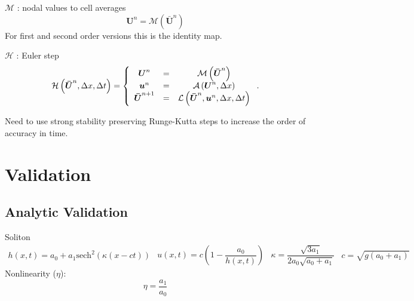 \documentclass[pdf]{beamer}
\begin{document}
\begin{frame}{$\mathcal{M}$ : nodal values to cell averages}
\[
	\boldsymbol{U}^n = \mathcal{M}\left(\boldsymbol{\bar{U}}^n\right) \]
For first and second order versions this is the identity map.
\end{frame}


\begin{frame}{$\mathcal{H}$ : Euler step}
\[\mathcal{H}\left(\boldsymbol{\bar{U}}^n,\Delta x ,\Delta t \right) = \left\lbrace 
\begin{array}{c c c} 
	\boldsymbol{U}^n &=& \mathcal{M}\left(\boldsymbol{\bar{U}}^n\right) \\
	\boldsymbol{u}^n &=& \mathcal{A}\left(\boldsymbol{U}^n, \Delta x\right) \\
	\boldsymbol{\bar{U}}^{n+1} &=& \mathcal{L}\left(\boldsymbol{\bar{U}}^{n},\boldsymbol{u}^n, \Delta x ,\Delta t\right)							
\end{array} \right. .\]

Need to use strong stability preserving Runge-Kutta \cite{Gottlieb-etal-2009-251} steps to increase the order of accuracy in time.
\end{frame}

\section{Validation}
\subsection{Analytic Validation}

\begin{frame}{Soliton}
\begin{subequations}
\begin{gather}
h\left(x,t\right) = a_0 + a_1\text{sech}^2\left( \kappa\left(x - ct\right)\right)
\end{gather}
\begin{gather}
u\left(x,t\right) = c\left(1 - \dfrac{a_0}{h(x,t)} \right)
\end{gather}
\begin{gather}
\kappa = \dfrac{\sqrt{3a_1}}{2a_0 \sqrt{ a_0 + a_1}}
\end{gather}
\begin{gather}
c = \sqrt{g \left(a_0 + a_1\right)}
\end{gather}
\label{eq:sol}
\end{subequations}
Nonlinearity ($\eta$):
\[\eta = \frac{a_1}{a_0}\]
\end{frame}
\end{document}
